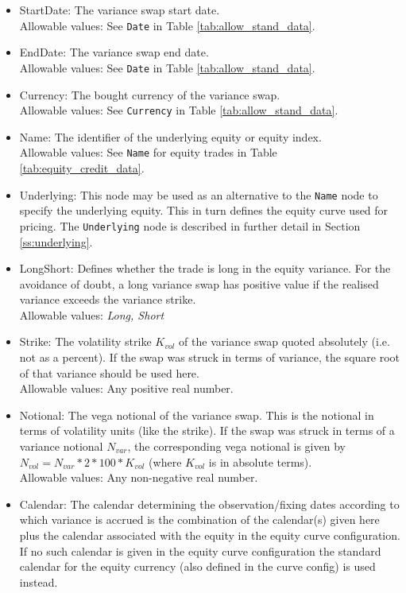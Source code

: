 \begin{itemize}
	\item StartDate: The variance swap start date. \\
	Allowable values: See \lstinline!Date! in Table \ref{tab:allow_stand_data}.
	\item EndDate: The variance swap end date. \\
	Allowable values: See \lstinline!Date! in Table \ref{tab:allow_stand_data}.
	\item Currency: The bought currency of the variance swap. \\
	Allowable values: See \lstinline!Currency! in Table \ref{tab:allow_stand_data}.
	\item Name: The identifier of the underlying equity or equity index. \\
	Allowable values: See \lstinline!Name! for equity trades in Table \ref{tab:equity_credit_data}. \\
	\item Underlying:  This node may be used as an alternative to the \lstinline!Name! node to specify the underlying equity. This in turn defines the equity curve used for pricing. The \lstinline!Underlying! node is described in further detail in Section \ref{ss:underlying}. \\
	\item LongShort: Defines whether the trade is long in the equity variance. For the avoidance of doubt, a long variance swap has positive value if the realised variance exceeds the variance strike. \\
	Allowable values: \emph{Long, Short}
	\item Strike: The volatility strike $K_{vol}$ of the variance swap quoted absolutely (i.e. not as a percent). If the swap was struck in terms of variance, the square root of that variance should be used here.\\
	Allowable values: Any positive real number.
	\item Notional: The vega notional of the variance swap. This is the notional in terms of volatility units (like the strike). If the swap was struck in terms of a variance notional $N_{var}$, the corresponding vega notional is given by $N_{vol} = N_{var} * 2 * 100 * K_{vol}$ (where $K_{vol}$ is in absolute terms).\\
	Allowable values: Any non-negative real number.
	\item Calendar: The calendar determining the observation/fixing dates according to which variance is accrued is the combination of the calendar(s) given here plus the calendar associated with the equity in the equity curve configuration. If no such calendar is given in the equity curve configuration the standard calendar for the equity currency (also defined in the curve config) is used instead. \\

\end{itemize}
